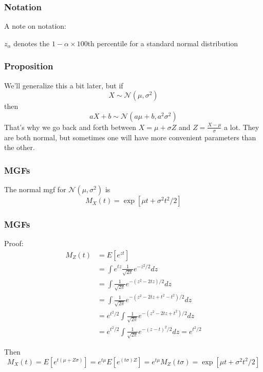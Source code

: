 \documentclass{beamer}
\begin{document}

\begin{frame}
\frametitle{Notation}

A note on notation:
\newline

$z_{\alpha}$ denotes the $1-\alpha \times 100$th percentile for a standard normal distribution


\end{frame}



\begin{frame}
\frametitle{Proposition}

We'll generalize this a bit later, but if
\[
X \sim \mathcal{N}(\mu, \sigma^2)
\]
then 
\[
aX + b \sim \mathcal{N}(a \mu + b, a^2 \sigma^2)
\]
That's why we go back and forth between $X = \mu + \sigma Z$ and $Z = \frac{X-\mu}{\sigma}$ a lot. They are both normal, but sometimes one will have more convenient parameters than the other. 

\end{frame}



\begin{frame}
\frametitle{MGFs}

The normal mgf  for $\mathcal{N}(\mu, \sigma^2)$ is 
\[
M_X(t) = \exp\left[ \mu t + \sigma^2 t^2 / 2\right]
\]


\end{frame}


\begin{frame}
\frametitle{MGFs}

Proof:
\begin{align*}
M_Z(t) &= E[e^{zt}] \\
&= \int e^{tz} \frac{1}{\sqrt{2\pi}} e^{-z^2/2}dz \\
&= \int \frac{1}{\sqrt{2\pi}} e^{-(z^2 - 2tz)/2}dz \\
&= \int \frac{1}{\sqrt{2\pi}} e^{-(z^2 - 2tz + t^2 - t^2)/2}dz \\
&= e^{t^2/2}  \int \frac{1}{\sqrt{2\pi}} e^{-(z^2 - 2tz + t^2 )/2}dz \\
&= e^{t^2/2}  \int \frac{1}{\sqrt{2\pi}} e^{-(z - t)^2/2}dz = e^{t^2/2}
\end{align*}

Then 
\[
M_X(t) = E[e^{t(\mu + Z \sigma)}] = e^{t\mu} E[e^{(t \sigma) Z}] = e^{t\mu} M_Z(t\sigma) = \exp\left[\mu t + \sigma^2t^2/2 \right]
\]
\end{frame}
\end{document}
